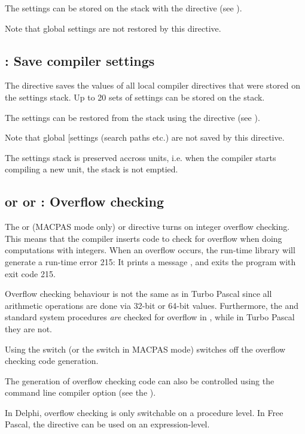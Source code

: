 The settings can be stored on the stack with the  directive
(see ).

Note that global settings are not restored by this directive.

\subsection{ : Save compiler settings}
\label{se:Push}
The  directive saves the values of all local compiler
directives that were stored on the settings stack. Up to 20 sets of
settings can be stored on the stack.

The settings can be restored from the stack using the  directive
(see ).

Note that global [settings (search paths etc.) are not saved by this 
directive.

The settings stack is preserved accross units, i.e. when the compiler starts
compiling a new unit, the stack is not emptied.

\subsection{ or  or : Overflow checking}
The  or  (MACPAS mode only) or  directive turns on
integer overflow checking. This means that the compiler inserts code
to check for overflow when doing computations with integers.
When an overflow occurs, the run-time library will generate a run-time error
215: It prints a message , and exits the program with exit code 215.

\begin{remark}Overflow checking behaviour is not the same as in
Turbo Pascal since all arithmetic operations are done via 32-bit or
64-bit values. Furthermore, the  and  standard system
procedures {\em are} checked for overflow in \fpc, while in Turbo
Pascal they are not.
\end{remark}
Using the  switch (or the  switch in MACPAS mode) switches off the overflow
checking code generation.

The generation of overflow checking code can also be controlled
using the  command line compiler option (see the \userref).

In Delphi, overflow checking is only switchable on a procedure level. In Free
Pascal, the  directive can be used on an expression-level.

